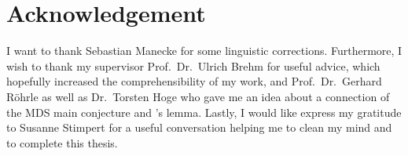 \pagestyle{empty}
\section*{Acknowledgement}

I want to thank Sebastian Manecke for some linguistic corrections.
Furthermore, I wish to thank my supervisor Prof.~Dr.~Ulrich Brehm for useful advice, which hopefully increased the comprehensibility of my work, and Prof.~Dr.~Gerhard Röhrle as well as Dr.~Torsten Hoge who gave me an idea about a connection of the MDS main conjecture and 's lemma.
Lastly, I would like express my gratitude to Susanne Stimpert for a useful conversation helping me to clean my mind and to complete this thesis.
\cleardoublepage